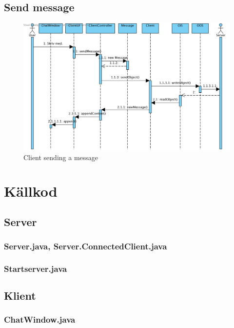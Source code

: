 \documentclass[a4paper,11pt]{article}
\begin{document}
\subsection{Send message}
	\begin{figure}[H]
		\centering
		\includegraphics[width=\textwidth]{diagram/Client_sendMessage.png}
		\caption{Client sending a message}
	\end{figure}


\section{Källkod}

	\subsection{Server}
		\subsubsection{Server.java, Server.ConnectedClient.java}
		
		\subsubsection{Startserver.java}
		
		
	\subsection{Klient}
		\subsubsection{ChatWindow.java}
		
\end{document}
